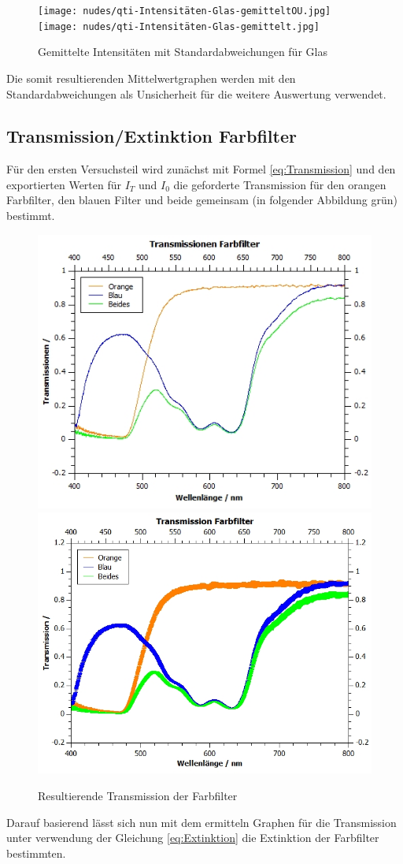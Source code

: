 \documentclass[12pt,a4paper,twoside]{article}
\begin{document}
\begin{figure}[H]
    \centering
    \texttt{[image: nudes/qti-Intensitäten-Glas-gemitteltOU.jpg]}
    \texttt{[image: nudes/qti-Intensitäten-Glas-gemittelt.jpg]}
    \caption{Gemittelte Intensitäten mit Standardabweichungen für Glas}
    \label{fig:GemittelteGraphenIntensitätenGlas}
\end{figure}

\noindent
Die somit resultierenden Mittelwertgraphen werden mit den Standardabweichungen als Unsicherheit für die weitere Auswertung verwendet.

\subsection{Transmission/Extinktion Farbfilter}

Für den ersten Versuchsteil wird zunächst mit Formel \ref{eq:Transmission} und den exportierten Werten für $I_{T}$ und $I_{0}$ die geforderte Transmission für den orangen Farbfilter, den blauen Filter und beide gemeinsam (in folgender Abbildung grün) bestimmt.

\begin{figure}[H]
    \centering
    \includegraphics[width=0.4\linewidth]{nudes/qti-Transmission-FarbfilterOU.jpg}
    \includegraphics[width=0.4\linewidth]{nudes/qti-Transmission-Farbfilter.jpg}
    \caption{Resultierende Transmission der Farbfilter}
    \label{fig:TransmissionFarbfilter}
\end{figure}

\noindent
Darauf basierend lässt sich nun mit dem ermitteln Graphen für die Transmission unter verwendung der Gleichung \ref{eq:Extinktion} die Extinktion der Farbfilter bestimmten.
\end{document}
